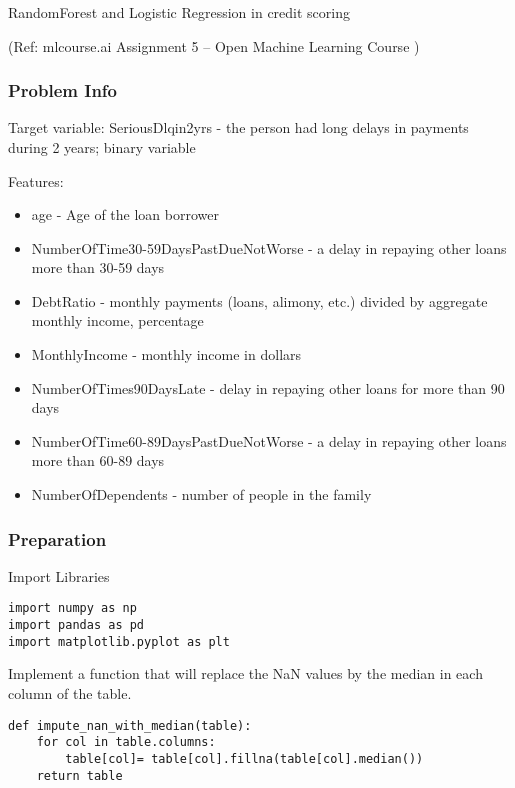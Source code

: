 \begin{frame}[fragile]\frametitle{}
\begin{center}
{\Large RandomForest and Logistic Regression in credit scoring}

{\tiny (Ref: mlcourse.ai Assignment 5 – Open Machine Learning Course ) }
\end{center}

\end{frame}


\begin{frame}[fragile]\frametitle{Problem Info}
Target variable: SeriousDlqin2yrs - the person had long delays in payments during 2 years; binary variable

Features:
\begin{itemize}
\item age - Age of the loan borrower 
\item NumberOfTime30-59DaysPastDueNotWorse - a delay in repaying other loans more than 30-59 days 
\item DebtRatio - monthly payments (loans, alimony, etc.) divided by aggregate monthly income, percentage
\item MonthlyIncome - monthly income in dollars
\item NumberOfTimes90DaysLate - delay in repaying other loans for more than 90 days
\item NumberOfTime60-89DaysPastDueNotWorse - a delay in repaying other loans more than 60-89 days
\item NumberOfDependents - number of people in the family
\end{itemize}
\end{frame}


\begin{frame}[fragile]\frametitle{Preparation}
Import Libraries
\begin{lstlisting}
import numpy as np
import pandas as pd
import matplotlib.pyplot as plt
\end{lstlisting}
 Implement a function that will replace the NaN values by the median in each column of the table.
 \begin{lstlisting}
def impute_nan_with_median(table):
    for col in table.columns:
        table[col]= table[col].fillna(table[col].median())
    return table  
\end{lstlisting}
\end{frame}

